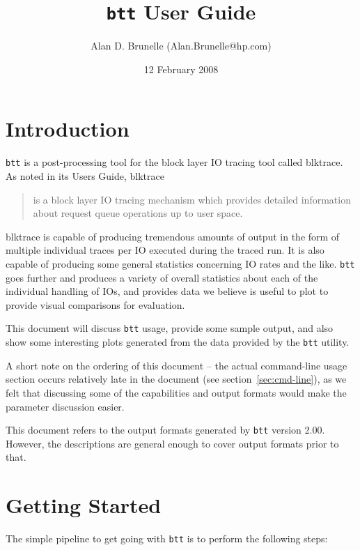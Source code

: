 \documentclass{article}
\title{\texttt{btt} User Guide}
\author{Alan D. Brunelle (Alan.Brunelle@hp.com)}
\date{12 February 2008}
\begin{document}
\maketitle
\section{\label{sec:intro}Introduction}

\texttt{btt} is a post-processing tool for the block layer IO tracing
tool called blktrace. As noted in its Users Guide, blktrace

  \begin{quotation}
    is a block layer IO tracing mechanism which provides detailed
    information about request queue operations up to user space.
  \end{quotation}

blktrace is capable of producing tremendous amounts of output in the
form of multiple individual traces per IO executed during the traced
run. It is also capable of producing some general statistics concerning
IO rates and the like. \texttt{btt} goes further and produces a variety
of overall statistics about each of the individual handling of IOs, and
provides data we believe is useful to plot to provide visual comparisons
for evaluation.

This document will discuss \texttt{btt} usage, provide some sample output,
and also show some interesting plots generated from the data provided
by the \texttt{btt} utility.

\bigskip
A short note on the ordering of this document -- the actual
command-line usage section occurs relatively late in the document (see
section~\ref{sec:cmd-line}), as we felt that discussing some of the
capabilities and output formats would make the parameter discussion
easier.

\bigskip
  This document refers to the output formats generated by \texttt{btt}
  version 2.00.  However, the descriptions are general enough to cover
  output formats prior to that.

\newpage\tableofcontents

\newpage\section{\label{sec:getting-started}Getting Started}

  The simple pipeline to get going with \texttt{btt} is to perform the
  following steps:
\end{document}
